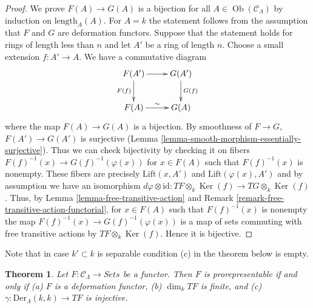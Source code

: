 \documentclass{stacks-project}
\theoremstyle{plain}
\newtheorem{theorem}[subsection]{Theorem}
\theoremstyle{definition}
\theoremstyle{remark}
\numberwithin{equation}{subsection}
\def\Ob{\mathop{\mathrm{Ob}}\nolimits}
\def\Ker{\mathop{\mathrm{Ker}}}
\begin{document}
\begin{proof}
We prove $F(A) \to G(A)$ is a bijection for all $A \in
\Ob(\mathcal{C}_\Lambda)$ by induction on
$\text{length}_A(A)$.  For $A = k$ the statement follows from the
assumption that $F$ and $G$ are deformation functors. Suppose that the
statement holds for rings of length less than $n$ and let $A'$ be a ring of
length $n$. Choose a small extension $f : A' \to A$.  We have a
commutative diagram
$$
\xymatrix{
F(A') \ar[r] \ar[d]_{F(f)} & G(A') \ar[d]^{G(f)} \\
F(A) \ar[r]^{\sim} & G(A)
}
$$
where the map $F(A) \to G(A)$ is a bijection.  By smoothness of $F
\to G$, $F(A') \to G(A')$ is surjective (Lemma
\ref{lemma-smooth-morphism-essentially-surjective}).  Thus we can check
bijectivity by checking it on fibers $F(f)^{-1}(x) \to
G(f)^{-1}(\varphi(x))$ for $x \in F(A)$ such that $F(f)^{-1}(x)$ is nonempty.
These fibers are precisely $\text{Lift}(x, A')$ and
$\text{Lift}(\varphi(x), A')$ and by assumption we have an isomorphism
$d\varphi \otimes \text{id} :
TF \otimes_k \Ker(f)  \to TG \otimes_k \Ker(f)$.
Thus, by
Lemma \ref{lemma-free-transitive-action} and
Remark \ref{remark-free-transitive-action-functorial},
for $x \in F(A)$ such that $F(f)^{-1}(x)$ is nonempty the map
$F(f)^{-1}(x) \to G(f)^{-1}(\varphi(x))$ is a map of sets commuting
with free transitive actions by $TF \otimes_k \Ker(f)$.
Hence it is bijective.
\end{proof}

\noindent
Note that in case $k' \subset k$ is separable condition (c) in
the theorem below is empty.

\begin{theorem}
\label{theorem-Schlessinger-prorepresentability}
Let $F: \mathcal{C}_\Lambda \to \textit{Sets}$ be a functor.
Then $F$ is prorepresentable if and only if
(a) $F$ is a deformation functor,
(b) $\dim_k TF$ is finite, and (c) $\gamma : \text{Der}_\Lambda(k, k) \to TF$
is injective.
\end{theorem}
\end{document}
